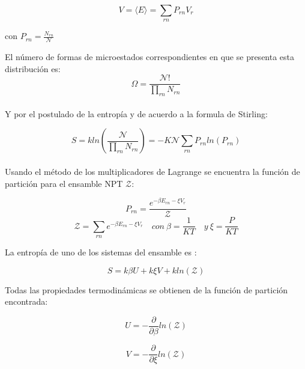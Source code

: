 \begin{equation} \label{volprobNPT}
    V = \langle E\rangle = \sum_{rn} P_{rn} V_r
\end{equation}

\begin{center}
    con $P_{rn} = \frac{N_{rn}}{\mathcal{N}}$
\end{center}

El número de formas de microestados correspondientes en que se presenta esta distribución es:\\

\begin{equation} \label{distribucionmultnom}
    \Omega = \frac{\mathcal{N}!}{\prod_{rn} N_{rn}}
\end{equation}\\

Y por el postulado de la entropía y de acuerdo a la formula de Stirling:

\begin{equation}  \label{entropiaboltzNPT}
    S = kln(\frac{\mathcal{N}}{\prod_{rn} N_{rn}}) = -K\mathcal{N}\sum_{rn} P_{rn} ln(P_{rn})
\end{equation}\\

Usando el método de los multiplicadores de Lagrange se encuentra la función de partición para el ensamble NPT $\mathcal{Z}$:

\begin{equation} \label{probNPT}
    P_{rn} = \frac{e^{-\beta E_{rn}-\xi V_r}}{\mathcal{Z}}
\end{equation}
\begin{equation} \label{funcpartNPT}
    \mathcal{Z} = \sum_{rn} e^{-\beta E_{rn}-\xi V_r} \quad con\ \beta=\frac{1}{KT} \quad y\ \xi=\frac{P}{KT}
\end{equation}

La entropía de uno de los sistemas del ensamble es \cite{mcquarrie1976}:

\begin{equation}
    S = k\beta U + k\xi V + kln(\mathcal{Z})
\end{equation}

Todas las propiedades termodinámicas se obtienen de la función de partición encontrada:

\begin{equation} \label{energNPT}
    U=-\frac{\partial}{\partial \beta}ln(\mathcal{Z})
\end{equation}

\begin{equation} \label{volNPT}
    V=-\frac{\partial}{\partial \xi}ln(\mathcal{Z})
\end{equation}

